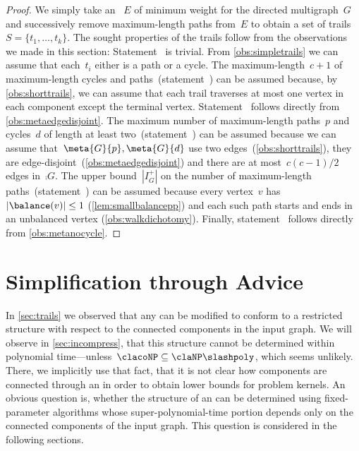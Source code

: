 \begin{proof}We simply take an \EE~$E$ of minimum weight for the directed multigraph~$G$ and successively remove maximum-length paths from~$E$ to obtain a set of trails~$S = \{t_1, \ldots, t_k\}$. The sought properties of the trails follow from the observations we made in this section: Statement~ is trivial. From \autoref{obs:simpletrails} we can assume that each~$t_i$ either is a path or a cycle. The maximum-length~$c + 1$ of maximum-length cycles and paths~(statement~) can be assumed because, by \autoref{obs:shorttrails}, we can assume that each trail traverses at most one vertex in each component except the terminal vertex. Statement~ follows directly from \autoref{obs:metaedgedisjoint}. The maximum number of maximum-length paths~$p$ and cycles~$d$ of length at least two~(statement~) can be assumed because we can assume that~$\meta{G}{p}, \meta{G}{d}$ use two edges~(\autoref{obs:shorttrails}), they are edge-disjoint~(\autoref{obs:metaedgedisjoint}) and there are at most~$c(c-1)/2$ edges in~$\comp{G}$. The upper bound~$|I^+_G|$ on the number of maximum-length paths~(statement~) can be assumed because every vertex~$v$ has~$|\balance(v)| \leq 1$ (\autoref{lem:smallbalancepp}) and each such path starts and ends in an unbalanced vertex (\autoref{obs:walkdichotomy}). Finally, statement~ follows directly from \autoref{obs:metanocycle}.
\end{proof}



\section{Simplification through Advice}\label{sec:advice}

In \autoref{sec:trails} we observed that any \EE{} can be modified to conform to a restricted structure with respect to the connected components in the input graph. We will observe in \autoref{sec:incompress}, that this structure cannot be determined within polynomial time---unless~$\clacoNP \subseteq \claNP \slashpoly$, which seems unlikely. There, we implicitly use that fact, that it is not clear how components are connected through an \EE{} in order to obtain lower bounds for problem kernels. An obvious question is, whether the structure of an \EE{} can be determined using fixed-parameter algorithms whose super-polynomial-time portion depends only on the connected components of the input graph. This question is considered in the following sections.

